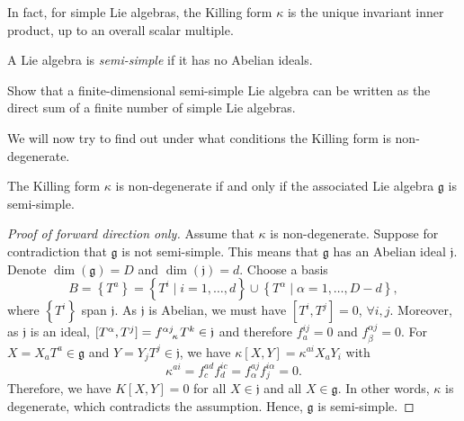 
In fact, for simple Lie algebras, the Killing form $\kappa$ is the unique invariant inner product, up to an overall scalar multiple.

\begin{definition}[]
  A Lie algebra is \emph{semi-simple} if it has no Abelian ideals.
\end{definition}

\begin{exercise}[Sheet 2 Qu 9b]
  Show that a finite-dimensional semi-simple Lie algebra can be written as the direct sum of a finite number of simple Lie algebras.
\end{exercise}

We will now try to find out under what conditions the Killing form is non-degenerate.
\begin{theorem}[by Cartan]
  The Killing form $\kappa$ is non-degenerate if and only if the associated Lie algebra $\mathfrak{g}$ is semi-simple.
\end{theorem}
\begin{proof}[Proof of forward direction only]
  Assume that $\kappa$ is non-degenerate.
  Suppose for contradiction that $\mathfrak{g}$ is not semi-simple.
  This means that $\mathfrak{g}$ has an Abelian ideal $\mathfrak{j}$.
  Denote $\dim(\mathfrak{g}) = D$ and $\dim(\mathfrak{j}) = d$.
  Choose a basis
  \begin{equation}
    B = \left\{ T^{a} \right\} = \left\{ T^{i} \mid i = 1, \dots, d \right\} \cup \left\{ T^{\alpha} \mid \alpha =1, \dots, D-d \right\},
  \end{equation}
  where $\left\{ T^{i} \right\}$ span $\mathfrak{j}$. As $\mathfrak{j}$ is Abelian, we must have $[T^{i}, T^{j}] = 0$, $\forall i, j$.
  Moreover, as $\mathfrak{j}$ is an ideal, $[T^{\alpha}, T^{j}] = f \indices{^{\alpha j}_{\kappa}} T^{k} \in \mathfrak{j}$ and therefore $f^{ij}_{a} = 0$ and $f^{\alpha j}_{\beta} =0$.
  For $X = X_{a} T^{a} \in \mathfrak{g}$ and $Y = Y_{j} T^{j} \in \mathfrak{j}$, we have $\kappa[X, Y] = \kappa^{ai} X_{a} Y_{i}$ with
  \begin{equation}
    \kappa^{ai} = f^{ad}_{c} f^{ic}_{d} = f^{aj}_{\alpha} f^{i\alpha}_{j} = 0.
  \end{equation}
  Therefore, we have $K[X, Y] = 0$ for all $X \in \mathfrak{j}$ and all $X \in \mathfrak{g}$. In other words, $\kappa$ is degenerate, which contradicts the assumption.
  Hence, $\mathfrak{g}$ is semi-simple.
\end{proof}

